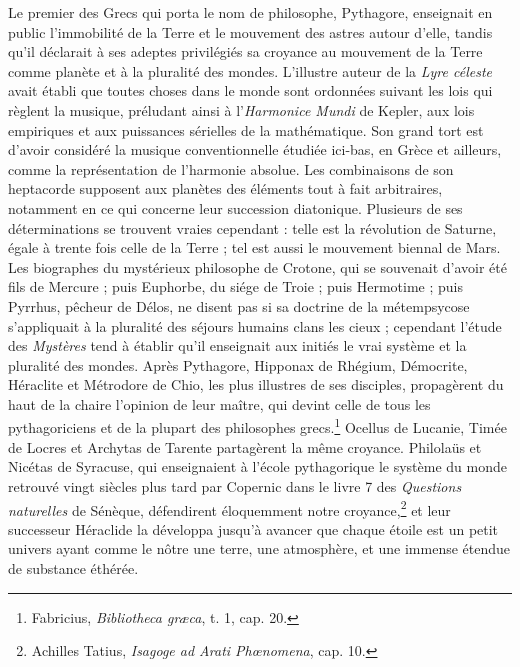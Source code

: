 \documentclass[a4paper, 11pt, oneside]{article}
\begin{document}
Le premier des Grecs qui porta le nom de philosophe, Pythagore, enseignait en public l'immobilité de la Terre et le mouvement des astres autour d'elle, tandis qu'il déclarait à ses adeptes privilégiés sa croyance au mouvement de la Terre comme planète et à la pluralité des mondes. L'illustre auteur de la \emph{Lyre céleste} avait établi que toutes choses dans le monde sont ordonnées suivant les lois qui règlent la musique, préludant ainsi à l'\emph{Harmonice Mundi} de Kepler, aux lois empiriques et aux puissances sérielles de la mathématique. Son grand tort est d'avoir considéré la musique conventionnelle étudiée ici-bas, en Grèce et ailleurs, comme la représentation de l'harmonie absolue. Les combinaisons de son heptacorde supposent aux planètes des éléments tout à fait arbitraires, notamment en ce qui concerne leur succession diatonique. Plusieurs de ses déterminations se trouvent vraies cependant : telle est la révolution de Saturne, égale à trente fois celle de la Terre ; tel est aussi le mouvement biennal de Mars. Les biographes du mystérieux philosophe de Crotone, qui se souvenait d'avoir été fils de Mercure ; puis Euphorbe, du siége de Troie ; puis Hermotime ; puis Pyrrhus, pêcheur de Délos, ne disent pas si sa doctrine de la métempsycose s'appliquait à la pluralité des séjours humains clans les cieux ; cependant l'étude des \emph{Mystères} tend à établir qu'il enseignait aux initiés le vrai système et la pluralité des mondes. Après Pythagore, Hipponax de Rhégium, Démocrite, Héraclite et Métrodore de Chio, les plus illustres de ses disciples, propagèrent du haut de la chaire l'opinion de leur maître, qui devint celle de tous les pythagoriciens et de la plupart des philosophes grecs.\footnote{Fabricius, \emph{Bibliotheca græca}, t. 1, cap. 20.} Ocellus de Lucanie, Timée de Locres et Archytas de Tarente partagèrent la même croyance. Philolaüs et Nicétas de Syracuse, qui enseignaient à l'école pythagorique le système du monde retrouvé vingt siècles plus tard par Copernic dans le livre 7 des \emph{Questions naturelles} de Sénèque, défendirent éloquemment notre croyance,\footnote{Achilles Tatius, \emph{Isagoge ad Arati Phœnomena}, cap. 10.} et leur successeur Héraclide la développa jusqu'à avancer que chaque étoile est un petit univers ayant comme le nôtre une terre, une atmosphère, et une immense étendue de substance éthérée.
\end{document}
